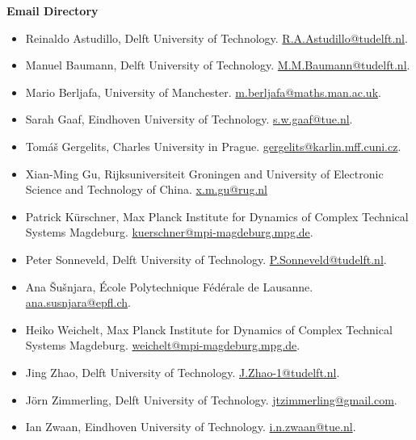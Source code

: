 \documentclass{article}
\begin{document}
\null\vfill\eject\thispagestyle{empty}\null\vfill\eject 












\newpage
\large{\textbf{Email Directory}}
\begin{itemize}

\item Reinaldo Astudillo, Delft University of Technology. \href{mailto:R.A.Astudillo@tudelft.nl}{R.A.Astudillo@tudelft.nl}.
\item Manuel Baumann, Delft University of Technology. \href{mailto:M.M.Baumann@tudelft.nl}{M.M.Baumann@tudelft.nl}.
\item Mario Berljafa, University of Manchester. \href{mailto:m.berljafa@maths.man.ac.uk}{m.berljafa@maths.man.ac.uk}.
\item Sarah Gaaf, Eindhoven University of Technology. \href{mailto:s.w.gaaf@tue.nl}{s.w.gaaf@tue.nl}.
\item Tom{\'a}{\v s} Gergelits, Charles University in Prague. \href{mailto:gergelits@karlin.mff.cuni.cz}{gergelits@karlin.mff.cuni.cz}.
\item Xian-Ming Gu, Rijksuniversiteit Groningen and University of
Electronic Science and Technology of China. \href{mailto:x.m.gu@rug.nl}{x.m.gu@rug.nl}
\item Patrick K\"{u}rschner, Max Planck Institute for Dynamics of Complex
Technical Systems Magdeburg. \href{mailto:kuerschner@mpi-magdeburg.mpg.de}{kuerschner@mpi-magdeburg.mpg.de}.
\item Peter Sonneveld, Delft University of Technology. \href{mailto:P.Sonneveld@tudelft.nl}{P.Sonneveld@tudelft.nl}.
\item Ana {\v S}u{\v s}njara, \'{E}cole Polytechnique F\'ed\'erale de Lausanne. \href{mailto:ana.susnjara@epfl.ch}{ana.susnjara@epfl.ch}.
\item Heiko Weichelt, Max Planck Institute for Dynamics of Complex
Technical Systems Magdeburg. \href{mailto:weichelt@mpi-magdeburg.mpg.de}{weichelt@mpi-magdeburg.mpg.de}.
\item Jing Zhao, Delft University of Technology. \href{mailto:J.Zhao-1@tudelft.nl}{J.Zhao-1@tudelft.nl}.
\item J\"orn Zimmerling, Delft University of Technology. \href{mailto:jtzimmerling@gmail.com}{jtzimmerling@gmail.com}.
\item Ian Zwaan, Eindhoven University of Technology. \href{mailto:i.n.zwaan@tue.nl}{i.n.zwaan@tue.nl}.


\end{itemize}
\end{document}
